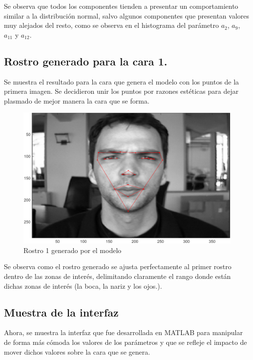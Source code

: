 \documentclass[11pt, letterpaper]{article}
\begin{document}
Se observa que todos los componentes tienden a presentar un  comportamiento similar a la distribución normal, salvo algunos componentes que presentan valores muy alejados del resto, como se observa en el histograma del parámetro $a_2$, $a_9$, $a_{11}$ y $a_{12}$. 

\newpage

\subsection{Rostro generado para la cara 1.}

Se muestra el resultado para la cara que genera el modelo con los puntos de la primera imagen. Se decidieron unir los puntos por razones estéticas para dejar plasmado de mejor manera la cara que se forma.

\begin{figure}[h!]
	\centering %
	\includegraphics[width=1\textwidth]{IMG/G3.png} %
	\caption{Rostro 1 generado por el modelo}
	\label{fig:f4}
\end{figure}

Se observa como el rostro generado se ajusta perfectamente al primer rostro dentro de las zonas de interés, delimitando claramente el rango donde están dichas zonas de interés (la boca, la nariz y los ojos.).

\newpage

\subsection{Muestra de la interfaz}

Ahora, se muestra la interfaz que fue desarrollada en MATLAB para manipular de forma más cómoda los valores de los parámetros y que se refleje el impacto de mover dichos valores sobre la cara que se genera.
\end{document}
